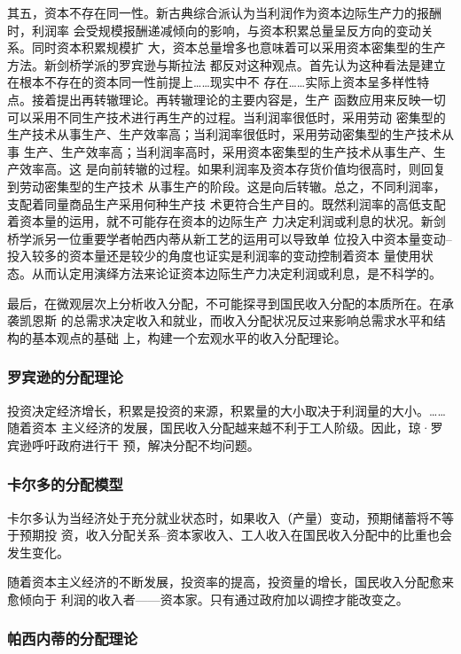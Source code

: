其五，资本不存在同一性。新古典综合派认为当利润作为资本边际生产力的报酬时，利润率
会受规模报酬递减倾向的影响，与资本积累总量呈反方向的变动关系。同时资本积累规模扩
大，资本总量增多也意味着可以采用资本密集型的生产方法。新剑桥学派的罗宾逊与斯拉法
都反对这种观点。首先认为这种看法是建立在根本不存在的资本同一性前提上……现实中不
存在……实际上资本呈多样性特点。接着提出再转辙理论。再转辙理论的主要内容是，生产
函数应用来反映一切可以采用不同生产技术进行再生产的过程。当利润率很低时，采用劳动
密集型的生产技术从事生产、生产效率高；当利润率很低时，采用劳动密集型的生产技术从事
生产、生产效率高；当利润率高时，采用资本密集型的生产技术从事生产、生产效率高。这
是向前转辙的过程。如果利润率及资本存货价值均很高时，则回复到劳动密集型的生产技术
从事生产的阶段。这是向后转辙。总之，不同利润率，支配着同量商品生产采用何种生产技
术更符合生产目的。既然利润率的高低支配着资本量的运用，就不可能存在资本的边际生产
力决定利润或利息的状况。新剑桥学派另一位重要学者帕西内蒂从新工艺的运用可以导致单
位投入中资本量变动--投入较多的资本量还是较少的角度也证实是利润率的变动控制着资本
量使用状态。从而认定用演绎方法来论证资本边际生产力决定利润或利息，是不科学的。

最后，在微观层次上分析收入分配，不可能探寻到国民收入分配的本质所在。在承袭凯恩斯
的总需求决定收入和就业，而收入分配状况反过来影响总需求水平和结构的基本观点的基础
上，构建一个宏观水平的收入分配理论。

\subsubsection{罗宾逊的分配理论}

投资决定经济增长，积累是投资的来源，积累量的大小取决于利润量的大小。……随着资本
主义经济的发展，国民收入分配越来越不利于工人阶级。因此，琼·罗宾逊呼吁政府进行干
预，解决分配不均问题。

\subsubsection{卡尔多的分配模型}

卡尔多认为当经济处于充分就业状态时，如果收入（产量）变动，预期储蓄将不等于预期投
资，收入分配关系--资本家收入、工人收入在国民收入分配中的比重也会发生变化。

随着资本主义经济的不断发展，投资率的提高，投资量的增长，国民收入分配愈来愈倾向于
利润的收入者——资本家。只有通过政府加以调控才能改变之。

\subsubsection{帕西内蒂的分配理论}

